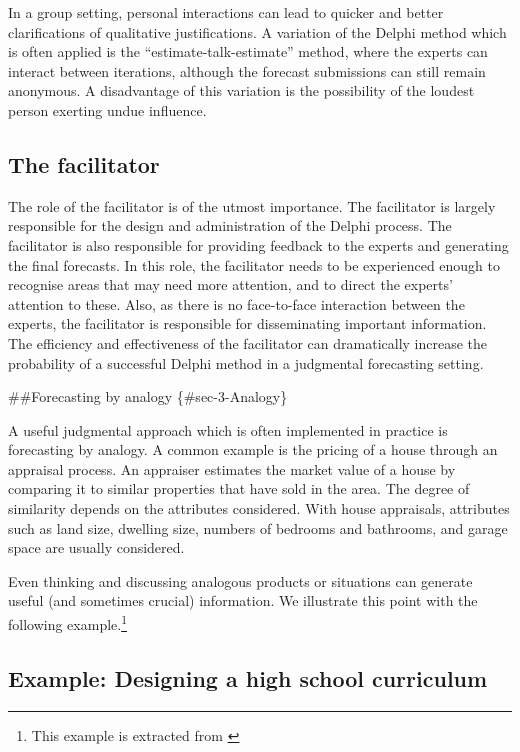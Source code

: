 \documentclass[]{book}
\let\rmarkdownfootnote\footnote%
\def\footnote{\protect\rmarkdownfootnote}
\begin{document}
In a group setting, personal interactions can lead to quicker and better clarifications of qualitative justifications. A variation of the Delphi method which is often applied is the ``estimate-talk-estimate'' method, where the experts can interact between iterations, although the forecast submissions can still remain anonymous. A disadvantage of this variation is the possibility of the loudest person exerting undue influence.

\hypertarget{the-facilitator}{%
\subsection*{The facilitator}\label{the-facilitator}}

The role of the facilitator is of the utmost importance. The facilitator is largely responsible for the design and administration of the Delphi process. The facilitator is also responsible for providing feedback to the experts and generating the final forecasts. In this role, the facilitator needs to be experienced enough to recognise areas that may need more attention, and to direct the experts' attention to these. Also, as there is no face-to-face interaction between the experts, the facilitator is responsible for disseminating important information. The efficiency and effectiveness of the facilitator can dramatically increase the probability of a successful Delphi method in a judgmental forecasting setting.

\#\#Forecasting by analogy \{\#sec-3-Analogy\}

A useful judgmental approach which is often implemented in practice is forecasting by analogy. A common example is the pricing of a house through an appraisal process. An appraiser estimates the market value of a house by comparing it to similar properties that have sold in the area. The degree of similarity depends on the attributes considered. With house appraisals, attributes such as land size, dwelling size, numbers of bedrooms and bathrooms, and garage space are usually considered.

Even thinking and discussing analogous products or situations can generate useful (and sometimes crucial) information. We illustrate this point with the following example.\footnote{This example is extracted from \citet{Kahneman1993}}

\hypertarget{example-designing-a-high-school-curriculum}{%
\subsection*{Example: Designing a high school curriculum}\label{example-designing-a-high-school-curriculum}}
\end{document}
